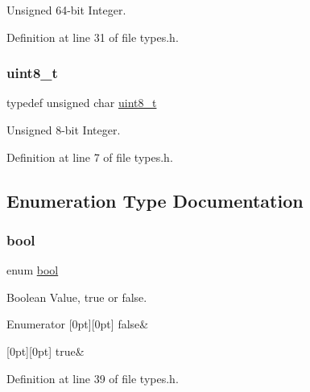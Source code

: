 Unsigned 64-\/bit Integer. 



Definition at line 31 of file types.\+h.

\mbox{\label{a00023_aba7bc1797add20fe3efdf37ced1182c5_aba7bc1797add20fe3efdf37ced1182c5}} 
\subsubsection{\texorpdfstring{uint8\+\_\+t}{uint8\_t}}
{\footnotesize\ttfamily typedef unsigned char \hyperlink{a00023_aba7bc1797add20fe3efdf37ced1182c5_aba7bc1797add20fe3efdf37ced1182c5}{uint8\+\_\+t}}



Unsigned 8-\/bit Integer. 



Definition at line 7 of file types.\+h.



\subsection{Enumeration Type Documentation}
\mbox{\label{a00023_af6a258d8f3ee5206d682d799316314b1_af6a258d8f3ee5206d682d799316314b1}} 
\subsubsection{\texorpdfstring{bool}{bool}}
{\footnotesize\ttfamily enum \hyperlink{a00023_af6a258d8f3ee5206d682d799316314b1_af6a258d8f3ee5206d682d799316314b1}{bool}}



Boolean Value, true or false. 

\begin{DoxyEnumFields}{Enumerator}
[0pt][0pt]{}\mbox{\label{a00023_af6a258d8f3ee5206d682d799316314b1_af6a258d8f3ee5206d682d799316314b1ae9de385ef6fe9bf3360d1038396b884c}} 
false&\\
\hline

[0pt][0pt]{}\mbox{\label{a00023_af6a258d8f3ee5206d682d799316314b1_af6a258d8f3ee5206d682d799316314b1a08f175a5505a10b9ed657defeb050e4b}} 
true&\\
\hline

\end{DoxyEnumFields}


Definition at line 39 of file types.\+h.

